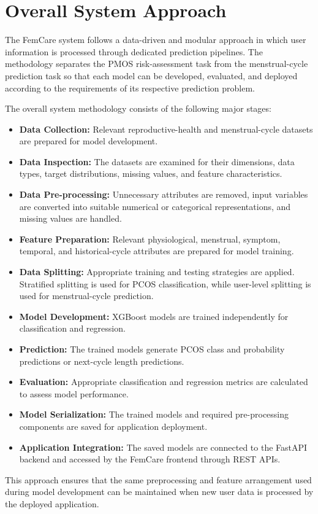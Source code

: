 \section{Overall System Approach}
\label{system approach}
The FemCare system follows a data-driven and modular approach in which user information is processed through dedicated prediction pipelines. The methodology separates the PMOS risk-assessment task from the menstrual-cycle prediction task so that each model can be developed, evaluated, and deployed according to the requirements of its respective prediction problem.

The overall system methodology consists of the following major stages:

\begin{itemize}
    \item \textbf{Data Collection:} Relevant reproductive-health and menstrual-cycle datasets are prepared for model development.
    \item \textbf{Data Inspection:} The datasets are examined for their dimensions, data types, target distributions, missing values, and feature characteristics.
    \item \textbf{Data Pre-processing:} Unnecessary attributes are removed, input variables are converted into suitable numerical or categorical representations, and missing values are handled.
    \item \textbf{Feature Preparation:}  Relevant physiological, menstrual, symptom, temporal, and historical-cycle attributes are prepared for model training.
    \item \textbf{Data Splitting:} Appropriate training and testing strategies are applied. Stratified splitting is used for PCOS classification, while user-level splitting is used for menstrual-cycle prediction.
    \item \textbf{Model Development:} XGBoost models are trained independently for classification and regression.
    \item \textbf{Prediction:} The trained models generate PCOS class and probability predictions or next-cycle length predictions.
    \item \textbf{Evaluation:} Appropriate classification and regression metrics are calculated to assess model performance.
    \item \textbf{Model Serialization:} The trained models and required pre-processing components are saved for application deployment.
    \item \textbf{Application Integration:} The saved models are connected to the FastAPI backend and accessed by the FemCare frontend through REST APIs. 
\end{itemize}
This approach ensures that the same preprocessing and feature arrangement used during model development can be maintained when new user data is processed by the deployed application.

